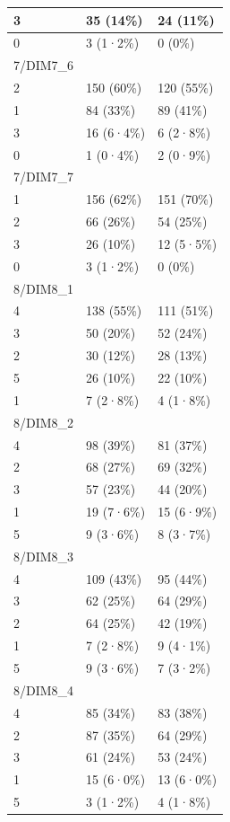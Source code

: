 \documentclass[
]{book}
\begin{document}
\begin{tabular}{l|l|l}
3 & 35 (14\%) & 24 (11\%)\\
\hline
0 & 3 (1·2\%) & 0 (0\%)\\
\hline
7/DIM7\_6 &  & \\
\hline
2 & 150 (60\%) & 120 (55\%)\\
\hline
1 & 84 (33\%) & 89 (41\%)\\
\hline
3 & 16 (6·4\%) & 6 (2·8\%)\\
\hline
0 & 1 (0·4\%) & 2 (0·9\%)\\
\hline
7/DIM7\_7 &  & \\
\hline
1 & 156 (62\%) & 151 (70\%)\\
\hline
2 & 66 (26\%) & 54 (25\%)\\
\hline
3 & 26 (10\%) & 12 (5·5\%)\\
\hline
0 & 3 (1·2\%) & 0 (0\%)\\
\hline
8/DIM8\_1 &  & \\
\hline
4 & 138 (55\%) & 111 (51\%)\\
\hline
3 & 50 (20\%) & 52 (24\%)\\
\hline
2 & 30 (12\%) & 28 (13\%)\\
\hline
5 & 26 (10\%) & 22 (10\%)\\
\hline
1 & 7 (2·8\%) & 4 (1·8\%)\\
\hline
8/DIM8\_2 &  & \\
\hline
4 & 98 (39\%) & 81 (37\%)\\
\hline
2 & 68 (27\%) & 69 (32\%)\\
\hline
3 & 57 (23\%) & 44 (20\%)\\
\hline
1 & 19 (7·6\%) & 15 (6·9\%)\\
\hline
5 & 9 (3·6\%) & 8 (3·7\%)\\
\hline
8/DIM8\_3 &  & \\
\hline
4 & 109 (43\%) & 95 (44\%)\\
\hline
3 & 62 (25\%) & 64 (29\%)\\
\hline
2 & 64 (25\%) & 42 (19\%)\\
\hline
1 & 7 (2·8\%) & 9 (4·1\%)\\
\hline
5 & 9 (3·6\%) & 7 (3·2\%)\\
\hline
8/DIM8\_4 &  & \\
\hline
4 & 85 (34\%) & 83 (38\%)\\
\hline
2 & 87 (35\%) & 64 (29\%)\\
\hline
3 & 61 (24\%) & 53 (24\%)\\
\hline
1 & 15 (6·0\%) & 13 (6·0\%)\\
\hline
5 & 3 (1·2\%) & 4 (1·8\%)\\

\end{tabular}
\end{document}
